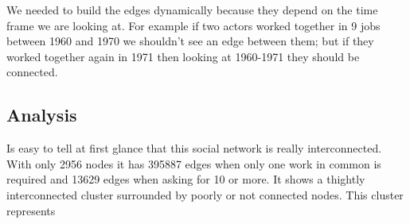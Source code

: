 We needed to build the edges dynamically because they depend on the time frame we are looking at. For example if two actors worked together in 9 jobs between 1960 and 1970 we shouldn't see an edge between them; but if they worked together again in 1971 then looking at 1960-1971 they should be connected.

\subsection{Analysis}
Is easy to tell at first glance that this social network is really interconnected. With only 2956 nodes it has 395887 edges when only one work in common is required and 13629 edges when asking for 10 or more. It shows a thightly interconnected cluster surrounded by poorly or not connected nodes. This cluster represents 



